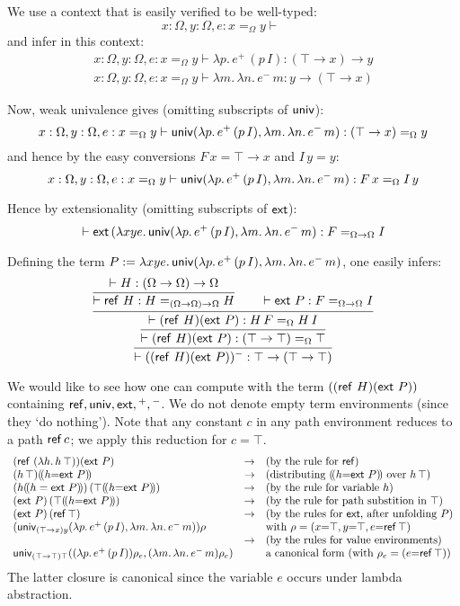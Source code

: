 \documentclass[10pt,a4paper]{article}
\newcommand{\lam}[2]{\lambda{#1.\,#2}}
\newcommand{\pbr}[1]{(\!(#1)\!)}
\newcommand{\Ref}{{\sf ref}}
\newcommand{\ext}{{\sf ext}}
\newcommand{\univ}{{\sf univ}}
\begin{document}
We use a context that is easily verified to be well-typed:
\[
x:\Omega, y:\Omega, e: x =_\Omega y \vdash\quad\quad
\]
and infer in this context:
\[
\begin{array}{lcl}
x:\Omega, y:\Omega, e: x =_\Omega y \vdash {\lambda p.\,{e^+\,(p\,I)}}:{(\top\to x)\to y}\\
x:\Omega, y:\Omega, e: x =_\Omega y \vdash {\lambda m.\,\lambda n.\,{e^-\,m}}:{y \to(\top\to x)}
\end{array}
\]

Now, weak univalence gives (omitting subscripts of $\univ$): 
\[
x:\Omega, y:\Omega, e: x =_\Omega y  \vdash \univ({\lambda p.\,{e^+\,(p\,I)}},{\lambda m.\,\lambda n.\,{e^-\,m}}) : (\top\to x) =_\Omega y
\]
and hence by the easy conversions $F\,x = \top\to x$ and $I\,y = y$:
\[
x:\Omega,y:\Omega,e: x=_\Omega y \vdash 
\univ(\lambda p.\,{e^+\,(p\,I)},\lambda m.\,\lambda n.\,e^-\,m) : F\,x =_\Omega I\,y
\]

Hence by extensionality (omitting subscripts of $\ext$):
\[
\vdash \ext\,(\lambda xye.\,\univ({\lambda p.\,{e^+\,(p\,I)}},{\lambda m.\,\lambda n.\,{e^-\,m}}): F =_{\Omega\to\Omega} I
\]

Defining the term 
$P:=\lambda xye.\,\univ({\lambda p.\,{e^+\,(p\,I)}},{\lambda m.\,\lambda n.\,{e^-\,m}})$, one easily infers:
\[
\infer{\vdash ((\Ref~H) (\ext~P))^-: \top \to (\top\to \top)}
{\infer{\vdash (\Ref~H) (\ext~P): (\top\to \top) =_\Omega \top}
{\infer{\vdash (\Ref~H) (\ext~P) : H\,F =_\Omega H\,I}
{\infer{\vdash \Ref~H : H =_{(\Omega\to\Omega)\to\Omega} H}
{\vdash H: (\Omega\to\Omega)\to\Omega}\quad\quad \vdash \ext~P : F =_{\Omega\to\Omega} I}}}
\]

We would like to see how one can compute with the term $((\Ref~H) (\ext~P))$ 
containing $\Ref,\univ,\ext,{}^+,{}^-$. 
We do not denote empty term environments (since they `do nothing'). 
Note that any constant $c$ in any path environment reduces to a path $\Ref\,c$;
we apply this reduction for $c=\top$.
\[
\begin{array}{lcl}
(\Ref~(\lam{h}{h\,\top}))(\ext~P)&\to
&(\mbox{by the rule for $\Ref$})\\
({h\,\top})\pbr{h{=}\ext~P}        &\to
&(\mbox{distributing $\pbr{h{=}\ext~P}$ over $h\,\top$})\\
(h\pbr{h=\ext~P})\,(\top\pbr{h{=}\ext~P})   &\to
&(\mbox{by the rule for variable $h$})\\
(\ext~P)\,(\top\pbr{h{=}\ext~P})   &\to
&(\mbox{by the rule for path substition in $\top$})\\
(\ext~P)\,(\Ref\,\top)          &\to
&(\mbox{by the rules for $\ext$, after unfolding $P$})\\
(\univ_{(\top{\to}x)y}({\lambda p.\,{e^+\,(p\,I)}},{\lambda m.\,\lambda n.\,{e^-\,m}}))\rho&
&\mbox{with $\rho= (x{=}\top,y{=}\top,e{=}\Ref\,\top)$}\\
                              &\to
&(\mbox{by the rules for value environments})\\
\univ_{(\top{\to}\top)\top}((\lambda p.\,{e^+\,(p\,I)})\rho_e,
(\lambda m.\,\lambda n.\,{e^-\,m})\rho_e)&
&\mbox{a canonical form (with $\rho_e = (e{=}\Ref\,\top)$)}
\end{array}
\]
The latter closure is canonical since the variable $e$ occurs under lambda abstraction.
\end{document}
